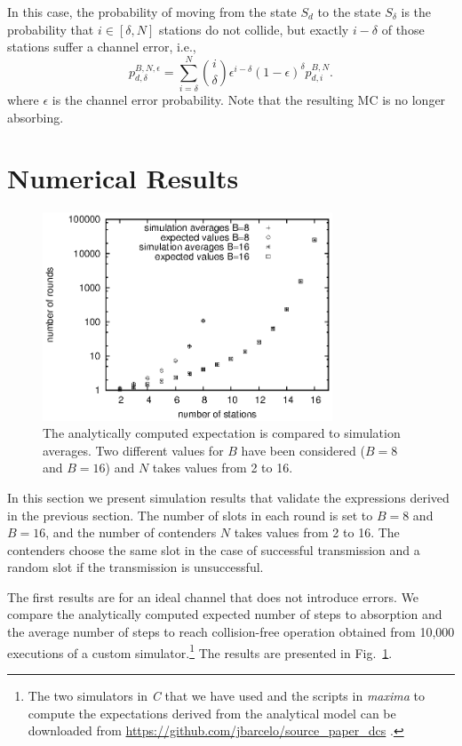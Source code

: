 \documentclass[journal]{IEEEtran}
\begin{document}
In this case, the probability of moving from the state $S_d$ to the state $S_\delta$ is the probability that $i \in \left[ \delta, N\right]$ stations do not collide, but exactly $i-\delta$ of those stations suffer a channel error, i.e.,
\begin{equation}
\label{eq:psiBNepsilon}
p^{B,N,\epsilon}_{d,\delta} = \sum_{i=\delta}^{N} \binom{i}{\delta} \epsilon^{i-\delta}(1-\epsilon)^\delta p^{B,N}_{d,i}.
\end{equation}
where $\epsilon$ is the channel error probability. Note that the resulting MC is no longer absorbing.

\section{Numerical Results}
\label{sec:numerical_results}

\begin{figure}
\centering
\includegraphics[height=6.2cm]{figures/convergence_avg}
\caption{The analytically computed expectation is compared to simulation averages. Two different values for $B$ have been considered ($B=8$ and $B=16$) and $N$ takes values from 2 to 16.}
\label{fig:convergence_avg}
\end{figure}


In this section we present simulation results that validate the expressions derived in the previous section.
The number of slots in each round is set to $B=8$ and $B=16$, and the number of contenders $N$ takes values from 2 to 16.
The contenders choose the same slot in the case of successful transmission and a random slot if the transmission is unsuccessful.

The first results are for an ideal channel that does not introduce errors.
We compare the analytically computed expected number of steps to absorption and the average number of steps to reach collision-free operation obtained from 10,000 executions of a custom simulator.\footnote{The two simulators in \emph{C} that we have used and the scripts in \emph{maxima} to compute the expectations derived from the analytical model can be downloaded from \url{https://github.com/jbarcelo/source_paper_dcs} .}
The results are presented in Fig.~\ref{fig:convergence_avg}.
\end{document}

